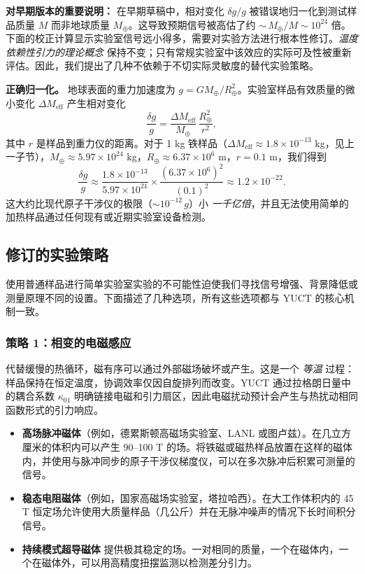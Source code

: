\documentclass[12pt]{article}
\theoremstyle{remark}
\begin{document}
	\textbf{对早期版本的重要说明：} 在早期草稿中，相对变化 $\delta g/g$ 被错误地归一化到测试样品质量 $M$ 而非地球质量 $M_\oplus$。这导致预期信号被高估了约 ${\sim}\, M_\oplus/M \sim 10^{24}$ 倍。下面的校正计算显示实验室信号远小得多，需要对实验方法进行根本性修订。\emph{温度依赖性引力的理论概念} 保持不变；只有常规实验室中该效应的实际可及性被重新评估。因此，我们提出了几种不依赖于不切实际灵敏度的替代实验策略。
	
	\textbf{正确归一化。} 地球表面的重力加速度为 $g = G M_\oplus / R_\oplus^2$。实验室样品有效质量的微小变化 $\Delta M_{\mathrm{eff}}$ 产生相对变化
	\begin{equation}
		\frac{\delta g}{g} = \frac{\Delta M_{\mathrm{eff}}}{M_\oplus}\,
		\frac{R_\oplus^2}{r^2},
		\label{eq:delta-g-correct}
	\end{equation}
	其中 $r$ 是样品到重力仪的距离。对于 1 kg 铁样品（$\Delta M_{\mathrm{eff}} \approx 1.8\times10^{-13}$ kg，见上一子节），$M_\oplus \approx 5.97\times10^{24}$ kg，$R_\oplus \approx 6.37\times10^{6}$ m，$r = 0.1$ m，我们得到
	\[
	\frac{\delta g}{g} \approx
	\frac{1.8\times10^{-13}}{5.97\times10^{24}} \times
	\frac{(6.37\times10^{6})^2}{(0.1)^2}
	\approx 1.2\times10^{-22}.
	\]
	这大约比现代原子干涉仪的极限（$\sim 10^{-12}\,g$）小 \emph{一千亿倍}，并且无法使用简单的加热样品通过任何现有或近期实验室设备检测。
	
	\subsection{修订的实验策略}
	\label{subsec:lab-revised}
	
	使用普通样品进行简单实验室实验的不可能性迫使我们寻找信号增强、背景降低或测量原理不同的设置。下面描述了几种选项，所有这些选项都与 YUCT 的核心机制一致。
	
	\subsubsection*{策略 1：相变的电磁感应}
	代替缓慢的热循环，磁有序可以通过外部磁场破坏或产生。这是一个 \emph{等温} 过程：样品保持在恒定温度，协调效率仅因自旋排列而改变。YUCT 通过拉格朗日量中的耦合系数 $\kappa_{01}$ 明确链接电磁和引力扇区，因此电磁扰动预计会产生与热扰动相同函数形式的引力响应。
	
	\begin{itemize}
		\item \textbf{高场脉冲磁体}（例如，德累斯顿高磁场实验室、LANL 或图卢兹）。在几立方厘米的体积内可以产生 90–100 T 的场。将铁磁或磁热样品放置在这样的磁体内，并使用与脉冲同步的原子干涉仪梯度仪，可以在多次脉冲后积累可测量的信号。
		\item \textbf{稳态电阻磁体}（例如，国家高磁场实验室，塔拉哈西）。在大工作体积内的 45 T 恒定场允许使用大质量样品（几公斤）并在无脉冲噪声的情况下长时间积分信号。
		\item \textbf{持续模式超导磁体} 提供极其稳定的场。一对相同的质量，一个在磁体内，一个在磁体外，可以用高精度扭摆监测以检测差分引力。
	\end{itemize}
	
\end{document}
